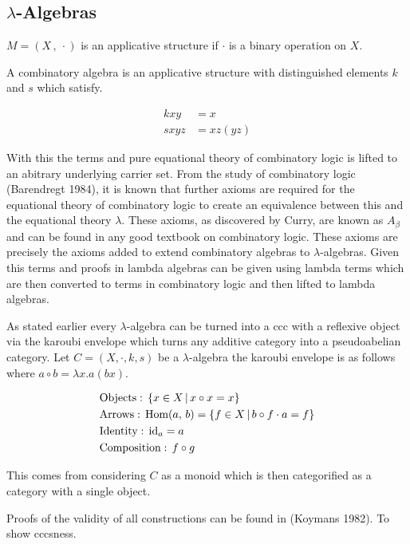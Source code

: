 \documentclass[a4paper,10pt]{article}
\begin{document}
\subsection{$\lambda$-Algebras}

$M = (X \, , \: \cdot)$ is an applicative structure if $\cdot$ is a binary operation on
$X$.


A combinatory algebra is an applicative structure with distinguished elements
$k$ and $s$ which satisfy.

\begin{align*}
kxy &= x \\
sxyz &= xz (yz)
\end{align*}

With this the terms and pure equational theory of combinatory logic is lifted to
an abitrary underlying carrier set. From the study of combinatory logic
(Barendregt 1984), it is known that further axioms are required for the
equational theory of combinatory logic to create an equivalence between this and
the equational theory $\lambda$. These axioms, as discovered by Curry, are known
as $A_{\beta}$ and can be found in any good textbook on combinatory logic. These
axioms are precisely the axioms added to extend combinatory algebras to
$\lambda$-algebras. Given this terms and proofs in lambda algebras can be given
using lambda terms which are then converted to terms in combinatory logic and
then lifted to lambda algebras.

As stated earlier every $\lambda$-algebra can be turned into a ccc with a
reflexive object via the karoubi envelope which turns any additive category into
a pseudoabelian category. Let $C = (X, \cdot , k, s)$ be a $\lambda$-algebra the
karoubi envelope is as follows where $a \circ b = \lambda x . a (b x)$.

\begin{align*}
    &\textnormal{Objects}: \, \{ x \in X \, | \, x \circ x = x \} \\
    &\textnormal{Arrows}: \, \textnormal{Hom}(a, \, b) =  \{ f \in X \, | \, b
        \circ f
    \cdot a = f\} \\
    &\textnormal{Identity}: \, \textnormal{id}_{a} = a \\
    &\textnormal{Composition}: \, f \circ g
\end{align*}

This comes from considering $C$ as a monoid which is then categorified as a
category with a single object.

Proofs of the validity of all constructions can be found in (Koymans 1982). To
show cccsness.
\end{document}
